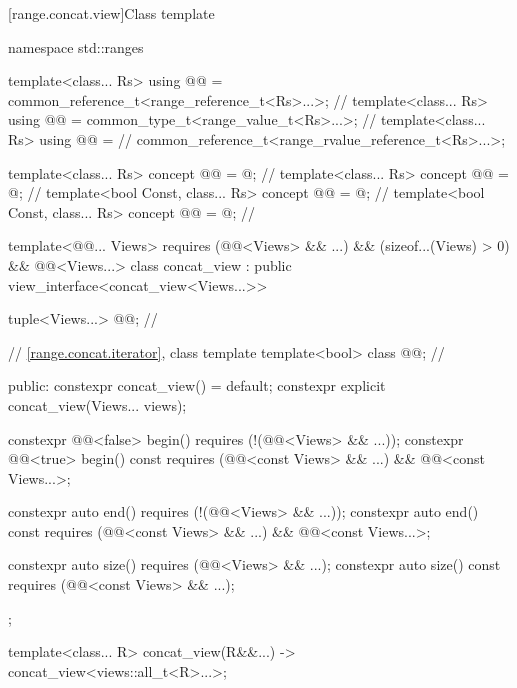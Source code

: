 [range.concat.view]{Class template }

%
\begin{codeblock}
namespace std::ranges {
  template<class... Rs>
  using @@ = common_reference_t<range_reference_t<Rs>...>;      // \expos
  template<class... Rs>
  using @@ = common_type_t<range_value_t<Rs>...>;                   // \expos
  template<class... Rs>
  using @@ =                                             // \expos
    common_reference_t<range_rvalue_reference_t<Rs>...>;

  template<class... Rs>
    concept @@ = @\seebelow@;     // \expos
  template<class... Rs>
    concept @@ = @\seebelow@;                     // \expos
  template<bool Const, class... Rs>
    concept @@ = @\seebelow@;        // \expos
  template<bool Const, class... Rs>
    concept @@ = @\seebelow@;        // \expos

  template<@@... Views>
    requires (@@<Views> && ...) && (sizeof...(Views) > 0) &&
              @@<Views...>
  class concat_view : public view_interface<concat_view<Views...>> {

    tuple<Views...> @@;                                             // \expos

    // \ref{range.concat.iterator}, class template 
    template<bool> class @@;                                      // \expos

  public:
    constexpr concat_view() = default;
    constexpr explicit concat_view(Views... views);

    constexpr @@<false> begin() requires (!(@@<Views> && ...));
    constexpr @@<true> begin() const
      requires (@@<const Views> && ...) && @@<const Views...>;

    constexpr auto end() requires (!(@@<Views> && ...));
    constexpr auto end() const
      requires (@@<const Views> && ...) && @@<const Views...>;

    constexpr auto size() requires (@@<Views> && ...);
    constexpr auto size() const requires (@@<const Views> && ...);
  };

  template<class... R>
    concat_view(R&&...) -> concat_view<views::all_t<R>...>;
}
\end{codeblock}

